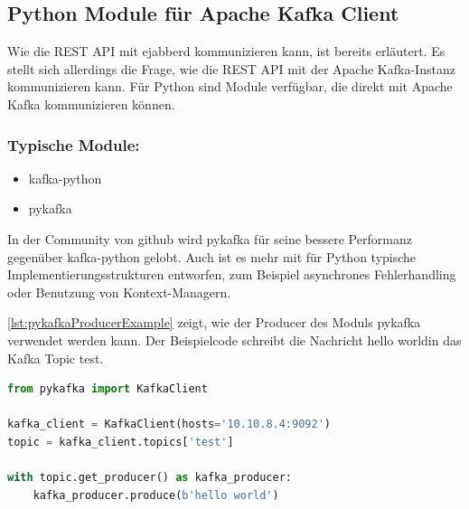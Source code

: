 \documentclass[a4paper,titlepage,halfparskip,12pt]{scrreprt}
\begin{document}
\begin{onehalfspacing}
\pagebreak

\section{Python Module für Apache Kafka Client}
\label{sec:KafkaModul}

Wie die \acs{REST} \acs{API} mit ejabberd kommunizieren kann, ist bereits erläutert. Es stellt sich allerdings die Frage, wie die \acs{REST} \acs{API} mit der Apache Kafka-Instanz kommunizieren kann. Für Python sind Module verfügbar, die direkt mit Apache Kafka kommunizieren können.

\subsubsection*{Typische Module:}

\begin{itemize}
\item kafka-python
\item pykafka
\end{itemize}

In der Community von github wird pykafka für seine bessere Performanz gegenüber kafka-python gelobt. Auch ist es mehr mit für Python typische Implementierungsstrukturen entworfen, zum Beispiel asynchrones Fehlerhandling oder Benutzung von Kontext-Managern.\cite{pykafkaGithubMeaning}

\autoref{lst:pykafkaProducerExample} zeigt, wie der Producer des Moduls pykafka verwendet werden kann. Der Beispielcode schreibt die Nachricht \glqq hello world\grqq in das Kafka Topic \glqq test\grqq.

\begin{lstlisting}[language=python, caption={Beispiel: Verwendung des Producers des Moduls pykafka}, label={lst:pykafkaProducerExample}]
from pykafka import KafkaClient

kafka_client = KafkaClient(hosts='10.10.8.4:9092')
topic = kafka_client.topics['test']

with topic.get_producer() as kafka_producer:
    kafka_producer.produce(b'hello world')
\end{lstlisting}


\end{onehalfspacing}
\end{document}

